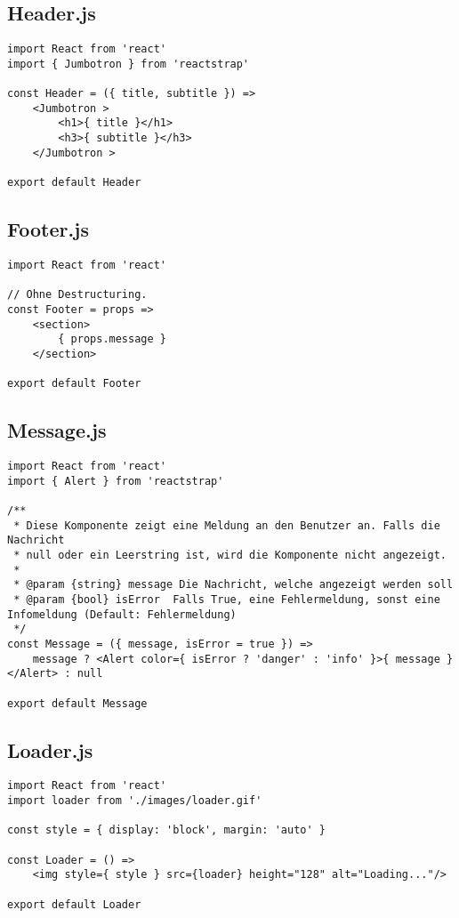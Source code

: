 \subsection{Header.js}
\begin{verbatim}
import React from 'react'
import { Jumbotron } from 'reactstrap'

const Header = ({ title, subtitle }) => 
    <Jumbotron >
        <h1>{ title }</h1>
        <h3>{ subtitle }</h3>
    </Jumbotron >

export default Header
\end{verbatim}

\subsection{Footer.js}

\begin{verbatim}
import React from 'react'

// Ohne Destructuring.
const Footer = props => 
    <section>
        { props.message }
    </section>

export default Footer
\end{verbatim}

\subsection{Message.js}

\begin{verbatim}
import React from 'react'
import { Alert } from 'reactstrap'

/**
 * Diese Komponente zeigt eine Meldung an den Benutzer an. Falls die Nachricht 
 * null oder ein Leerstring ist, wird die Komponente nicht angezeigt.
 * 
 * @param {string} message Die Nachricht, welche angezeigt werden soll
 * @param {bool} isError  Falls True, eine Fehlermeldung, sonst eine Infomeldung (Default: Fehlermeldung)
 */
const Message = ({ message, isError = true }) => 
    message ? <Alert color={ isError ? 'danger' : 'info' }>{ message }</Alert> : null

export default Message
\end{verbatim}

\subsection{Loader.js}

\begin{verbatim}
import React from 'react'
import loader from './images/loader.gif'

const style = { display: 'block', margin: 'auto' }

const Loader = () => 
    <img style={ style } src={loader} height="128" alt="Loading..."/>

export default Loader
\end{verbatim}


